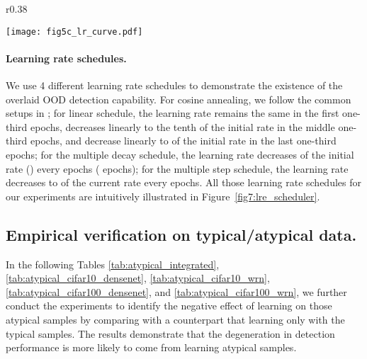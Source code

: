 \documentclass{article}
\theoremstyle{plain}
\theoremstyle{definition}
\theoremstyle{remark}
\begin{document}
\begin{wrapfigure}{r}{0.38\textwidth}
  \begin{center}
    \texttt{[image: fig5c\_lr\_curve.pdf]}
    \end{center}
    \vspace{-2mm}
    \caption{Learning Rate Scheduler.}
    \label{fig7:lre_scheduler}
\end{wrapfigure}
\paragraph{Learning rate schedules.} We use 4 different learning rate schedules to demonstrate the existence of the overlaid OOD detection capability. For cosine annealing, we follow the common setups in \citet{LoshchilovH17}; for linear schedule, the learning rate remains the same in the first one-third epochs, decreases linearly to the tenth of the initial rate in the middle one-third epochs, and decrease linearly to  of the initial rate in the last one-third epochs; for the multiple decay schedule, the learning rate decreases  of the initial rate () every  epochs ( epochs); for the multiple step schedule, the learning rate decreases to  of the current rate every  epochs. All those learning rate schedules for our experiments are intuitively illustrated in Figure~\ref{fig7:lre_scheduler}.


\subsection{Empirical verification on typical/atypical data.}
\label{app:exp_typical_atypical}

In the following Tables \ref{tab:atypical_integrated}, \ref{tab:atypical_cifar10_densenet}, \ref{tab:atypical_cifar10_wrn}, \ref{tab:atypical_cifar100_densenet}, and \ref{tab:atypical_cifar100_wrn}, we further conduct the experiments to identify the negative effect of learning on those atypical samples by comparing with a counterpart that learning only with the typical samples. The results demonstrate that the degeneration in detection performance is more likely to come from learning atypical samples.
\end{document}
